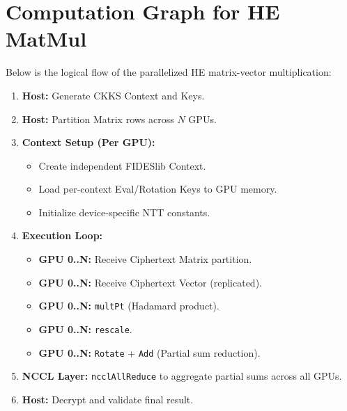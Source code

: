 \documentclass{article}
\begin{document}
\section{Computation Graph for HE MatMul}
Below is the logical flow of the parallelized HE matrix-vector multiplication:

\begin{enumerate}
    \item \textbf{Host:} Generate CKKS Context and Keys.
    \item \textbf{Host:} Partition Matrix rows across $N$ GPUs.
    \item \textbf{Context Setup (Per GPU):} 
        \begin{itemize}
            \item Create independent FIDESlib Context.
            \item Load per-context Eval/Rotation Keys to GPU memory.
            \item Initialize device-specific NTT constants.
        \end{itemize}
    \item \textbf{Execution Loop:}
        \begin{itemize}
            \item \textbf{GPU 0..N:} Receive Ciphertext Matrix partition.
            \item \textbf{GPU 0..N:} Receive Ciphertext Vector (replicated).
            \item \textbf{GPU 0..N:} \texttt{multPt} (Hadamard product).
            \item \textbf{GPU 0..N:} \texttt{rescale}.
            \item \textbf{GPU 0..N:} \texttt{Rotate} + \texttt{Add} (Partial sum reduction).
        \end{itemize}
    \item \textbf{NCCL Layer:} \texttt{ncclAllReduce} to aggregate partial sums across all GPUs.
    \item \textbf{Host:} Decrypt and validate final result.
\end{enumerate}
\end{document}
